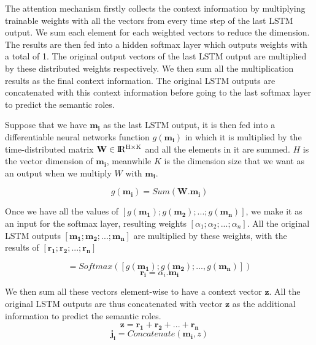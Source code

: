 The attention mechanism firstly collects the context information by multiplying trainable weights with all the vectors from every time step of the last LSTM output. We sum each element for each weighted vectors to reduce the dimension. The results are then fed into a hidden softmax layer which outputs weights with a total of 1. The original output vectors of the last LSTM output are multiplied by these distributed weights respectively. We then sum all the multiplication results as the final context information. The original LSTM outputs are concatenated with this context information before going to the last softmax layer to predict the semantic roles. 

Suppose that we have $\mathbf{m_{i}}$ as the last LSTM output, it is then fed into a differentiable neural networks function $g(\mathbf{m_{i}})$ in which it is multiplied by the time-distributed matrix $\textbf{W} \in {\rm I\!R^{H \times K}}$ and all the elements in it are summed. $H$ is the vector dimension of $\mathbf{m_{i}}$, meanwhile $K$ is the dimension size that we want as an output when we multiply \textbf{$W$} with $\mathbf{m_{i}}$.

\begin{equation}
\label{sum_weight}
g(\mathbf{m_{i}}) = Sum(\mathbf{W}.\mathbf{m_{i}})
\end{equation}

Once we have all the values of $[g(\mathbf{m_{1}}); g(\mathbf{m_{2}}); ...; g(\mathbf{m_{n}})]$, we make it as an input for the softmax layer, resulting weights $[\alpha_{1}; \alpha_{2}; ...; \alpha_{n}]$. All the original LSTM outputs $[\mathbf{m_{1}}; \mathbf{m_{2}}; ...; \mathbf{m_{n}}]$ are multiplied by these weights, with the results of $[\mathbf{r_{1}}; \mathbf{r_{2}}; ...; \mathbf{r_{n}}]$

\begin{equation}
[\alpha_{1}, \alpha_{2}, ..., \alpha_{n}] = Softmax([g(\mathbf{m_{1}}); g(\mathbf{m_{2}}); ..., g(\mathbf{m_{n}})])
\end{equation}
\begin{equation}
\mathbf{r_{i}} = \alpha_{i}.\mathbf{m_{i}}
\end{equation}

We then sum all these vectors element-wise to have a context vector $\mathbf{z}$. 
All the original LSTM outputs are thus concatenated with vector $\mathbf{z}$ as the additional information to predict the semantic roles.
\begin{equation}
\mathbf{z} = \mathbf{r_{1}} + \mathbf{r_{2}} + ... + \mathbf{r_{n}}
\end{equation}
\begin{equation}
\mathbf{j_{i}} = Concatenate(\mathbf{m_{i}}, z)
\end{equation}

